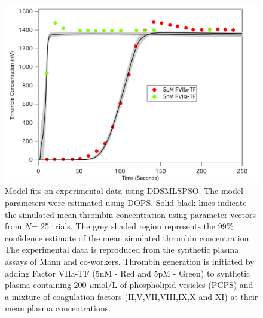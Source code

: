 \documentclass[12pt]{article}
\begin{document}
\begin{figure}[h]
\centering
\includegraphics[width=1.0\textwidth,height=0.5\textheight]{./figs/Figure_4_Sim_Train_E1_E5.pdf}
\caption{Model fits on experimental data using DDSMLSPSO. The model parameters were estimated using DOPS. Solid black lines indicate the simulated mean thrombin concentration using parameter vectors from $N$= 25 trials. The grey shaded region represents the 99\% confidence estimate of the mean simulated thrombin concentration. The experimental data is reproduced from the synthetic plasma assays of Mann and co-workers. Thrombin generation is initiated by adding Factor VIIa-TF (5nM - Red and 5pM - Green) to synthetic plasma containing 200 $\mu$mol/L of phospholipid vesicles (PCPS) and a mixture of coagulation factors (II,V,VII,VIII,IX,X and XI) at their mean plasma concentrations.
}\label{fig-train}
\end{figure}

\clearpage
\end{document}
